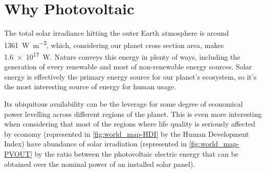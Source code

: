 \section{Why Photovoltaic}

	 The total solar irradiance hitting the outer Earth atmosphere is around \SI{1361}{\watt\per\square\metre},\cite{Kopp2011} which, considering our planet cross section area, makes \SI{1.6e17}{\watt}.
	Nature conveys this energy in plenty of ways, including the generation of every renewable and most of non-renewable energy sources.
	Solar energy is effectively the primary energy source for our planet's ecosystem, so it's the most interesting source of energy for human usage.

	 Its ubiquitous availability can be the leverage for some degree of economical power levelling across different regions of the planet.
	This is even more interesting when considering that most of the regions where life quality is seriously affected by economy (represented in \cref{fig:world_map-HDI} by the Human Development Index) have abundance of solar irradiation (represented in \cref{fig:world_map-PVOUT} by the ratio between the photovoltaic electric energy that can be obtained over the nominal power of an installed solar panel).

